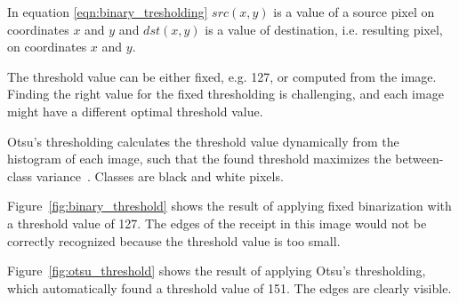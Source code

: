 \documentclass[
  digital, %
  table,   %
  oneside, %
  lof,     %
  lot,     %
]{fithesis3}
\begin{document}
\begin{enumerate}
    In equation \ref{eqn:binary_tresholding} $src(x,y)$ is a value of a source pixel on coordinates $x$ and $y$ and $dst(x,y)$ is a value of destination, i.e. resulting pixel, on coordinates $x$ and $y$.
    
    The threshold value can be either fixed, e.g. 127, or computed from the image. Finding the right value for the fixed thresholding is challenging, and each image might have a different optimal threshold value.
    
    Otsu's thresholding calculates the threshold value dynamically from the histogram of each image, such that the found threshold maximizes the between-class variance~\cite{Gonzalez2008Digital}. Classes are black and white pixels.
    
    Figure~\ref{fig:binary_threshold} shows the result of applying fixed binarization with a threshold value of 127. The edges of the receipt in this image would not be correctly recognized because the threshold value is too small.
    
    Figure~\ref{fig:otsu_threshold} shows the result of applying Otsu's thresholding, which automatically found a threshold value of 151. The edges are clearly visible.
    

\end{enumerate}
\end{document}
